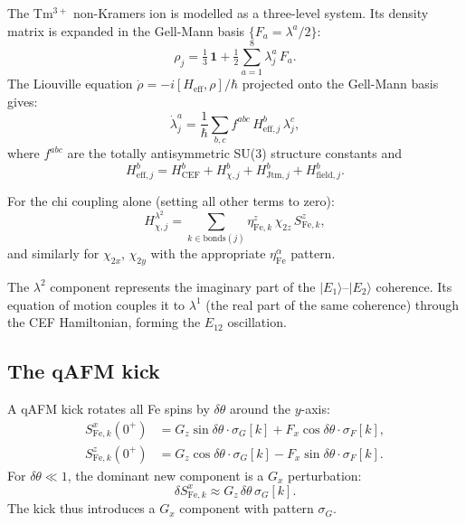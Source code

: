 \documentclass[11pt,a4paper]{article}
\newcommand{\sF}{\sigma_F}
\newcommand{\sG}{\sigma_G}
\newcommand{\lamt}{\lambda^2}
\newcommand{\EtA}{E_{12}}
\begin{document}
The Tm$^{3+}$ non-Kramers ion is modelled as a three-level system.
Its density matrix is expanded in the Gell-Mann basis $\{F_a = \lambda^a/2\}$:
\begin{equation}
  \rho_j = \tfrac{1}{3}\,\mathbf{1} + \tfrac{1}{2}\sum_{a=1}^{8}\lambda^a_j\,F_a.
\end{equation}
The Liouville equation $\dot\rho = -i[H_{\mathrm{eff}},\rho]/\hbar$ projected
onto the Gell-Mann basis gives:
\begin{equation}
  \dot\lambda^a_j = \frac{1}{\hbar}\sum_{b,c}f^{abc}\,H_{\mathrm{eff},j}^b\,\lambda^c_j,
  \label{eq:su3eom}
\end{equation}
where $f^{abc}$ are the totally antisymmetric SU(3) structure constants and
\begin{equation}
  H_{\mathrm{eff},j}^b = H_{\mathrm{CEF}}^b + H_{\chi,j}^b + H_{\mathrm{Jtm},j}^b
                       + H_{\mathrm{field},j}^b.
\end{equation}

For the chi coupling alone (setting all other terms to zero):
\begin{equation}
  H_{\chi,j}^{\lamt} = \sum_{k\in\mathrm{bonds}(j)}\eta^z_{\mathrm{Fe},k}
                        \,\chi_{2z}\,S^z_{\mathrm{Fe},k},
  \label{eq:Hchi_EOM}
\end{equation}
and similarly for $\chi_{2x}$, $\chi_{2y}$ with the appropriate
$\eta^\alpha_{\mathrm{Fe}}$ pattern.

The $\lamt$ component represents the imaginary part of the
$|E_1\rangle$--$|E_2\rangle$ coherence.  Its equation of motion couples it
to $\lambda^1$ (the real part of the same coherence) through the
CEF Hamiltonian, forming the $\EtA$ oscillation.

\subsection{The qAFM kick}

A qAFM kick rotates all Fe spins by $\delta\theta$ around the $y$-axis:
\begin{align}
  S^x_{\mathrm{Fe},k}(0^+) &= G_z\sin\delta\theta\cdot\sG[k] + F_x\cos\delta\theta\cdot\sF[k], \\
  S^z_{\mathrm{Fe},k}(0^+) &= G_z\cos\delta\theta\cdot\sG[k] - F_x\sin\delta\theta\cdot\sF[k].
\end{align}
For $\delta\theta \ll 1$, the dominant new component is a $G_x$ perturbation:
\begin{equation}
  \delta S^x_{\mathrm{Fe},k} \approx G_z\,\delta\theta\,\sG[k].
  \label{eq:qAFMkick}
\end{equation}
The kick thus introduces a $G_x$ component with pattern $\sG$.
\end{document}
